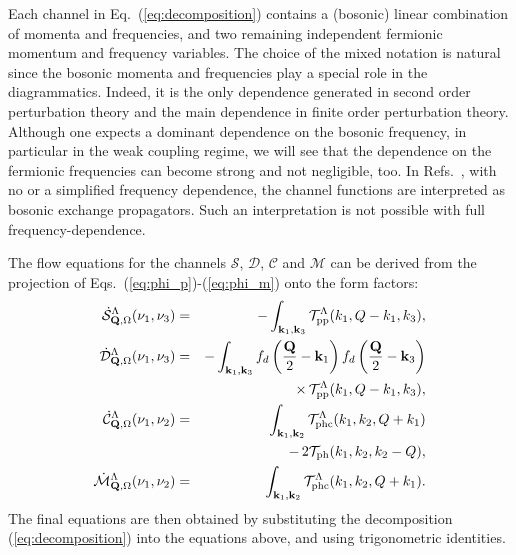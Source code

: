 Each channel in Eq.~(\ref{eq:decomposition}) contains a (bosonic) linear combination of momenta and frequencies, and two remaining independent fermionic momentum and frequency variables. 
The choice of the mixed notation is natural since the bosonic momenta and 
frequencies play a special role in the diagrammatics.
Indeed, it is the only dependence generated in second order perturbation theory and the main dependence in finite order perturbation theory.
Although one expects a dominant dependence on the bosonic frequency, in particular in the weak coupling regime, we will see that the dependence on the fermionic frequencies can become strong and not negligible, too.
In Refs.~, with no or a simplified frequency dependence, the channel functions are interpreted as bosonic exchange propagators. Such an interpretation is not possible with full frequency-dependence.

The flow equations for the channels $\mathcal{S}$,  $\mathcal{D}$, $\mathcal{C}$ and $\mathcal{M}$ can be derived from the projection of Eqs.~(\ref{eq:phi_p})-(\ref{eq:phi_m}) onto the form factors:
\begin{eqnarray}
\dot{\mathcal{S}}_{\mathbf{Q},\Omega}^{\Lambda}(\nu_1,\nu_3)  &=& - \int _{\mathbf{k}_1, \mathbf{k}_3 } \mathcal{T}^\Lambda_{\mathrm{pp}}(k_1,Q-k_1,k_3), \\ 
\dot{\mathcal{D}}_{\mathbf{Q},\Omega}^{\Lambda}(\nu_1,\nu_3)  &=& -
\int _{\mathbf{k}_1,\mathbf{k}_3}  f_d\left( {\frac{\mathbf{Q}}{2} - \mathbf{k}_1} \right ) f_d\left ({\frac{\mathbf{Q}}{2} - \mathbf{k}_3} \right)  \nonumber \\ 
 && \times \, \mathcal{T}^\Lambda_{\mathrm{pp}}(k_1,Q-k_1,k_3) , \\
\nonumber
\dot{\mathcal{C}}_{\mathbf{Q},\Omega}^{\Lambda}(\nu_1,\nu_2) &=& 
\int _{\mathbf{k}_1,\mathbf{k}_2}   \mathcal{T}^\Lambda_{\mathrm{phc}}(k_1,k_2,Q+k_1) \\
 && - \, 2\mathcal{T}_{\mathrm{ph}}(k_1,k_2,k_2-Q) , \\ 
\dot{\mathcal{M}}_{\mathbf{Q},\Omega}^{\Lambda}(\nu_1,\nu_2) & =& 
\int _{\mathbf{k}_1,\mathbf{k}_2}  \mathcal{T}^\Lambda_{\mathrm{phc}}(k_1,k_2,Q+k_1) . 
\end{eqnarray}
The final equations are then obtained by substituting the decomposition (\ref{eq:decomposition}) into the equations above, and using trigonometric identities.

